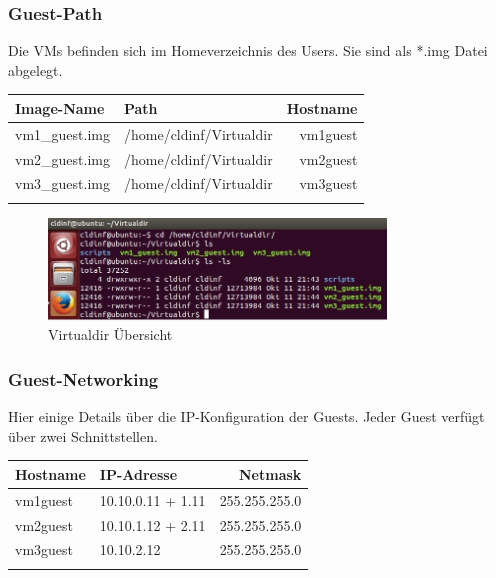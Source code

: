 \documentclass[a4,12pt]{scrartcl}
\begin{document}
\subsubsection{Guest-Path}
Die VMs befinden sich im Homeverzeichnis des Users. Sie sind als *.img Datei abgelegt.
\begin{center}
    \begin{tabular}{@{} l l r@{}}\toprule    
    {Image-Name} & {Path} & {Hostname}\\ \toprule
    vm1\_guest.img & /home/cldinf/Virtualdir & vm1guest\\ 
    vm2\_guest.img & /home/cldinf/Virtualdir & vm2guest\\
    vm3\_guest.img & /home/cldinf/Virtualdir & vm3guest\\ \addlinespace
    \bottomrule
    \end{tabular}
\end{center}

\begin{figure} [H]
	\begin{center}
	\includegraphics[width=0.80\textwidth]{./pictures/virtualdir.jpg}
	\caption{{Virtualdir Übersicht}}
	\label{virtualdir}
	\end{center}
\end{figure}

\subsubsection{Guest-Networking}
Hier einige Details über die IP-Konfiguration der Guests. Jeder Guest verfügt über zwei Schnittstellen.  
\begin{center}
    \begin{tabular}{@{} l l r@{}}\toprule    
    {Hostname} & {IP-Adresse} & {Netmask}\\ \toprule
    vm1guest & 10.10.0.11 + 1.11 & 255.255.255.0\\ 
    vm2guest & 10.10.1.12 + 2.11 & 255.255.255.0\\
    vm3guest & 10.10.2.12 & 255.255.255.0\\ \addlinespace
    \bottomrule
    \end{tabular}
\end{center}
\end{document}
